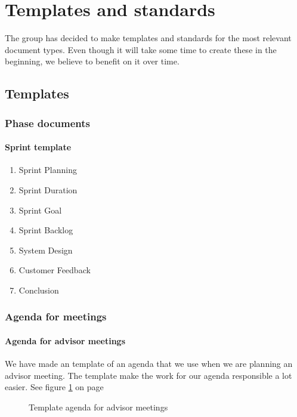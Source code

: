 \section{Templates and standards}
The group has decided to make templates and standards for the most relevant document types. Even though it will take some time to create these in the beginning, we believe to benefit on it over time.

\subsection{Templates}

\subsubsection{Phase documents}

\paragraph{Sprint template}\hfill
\begin{enumerate}
\item{}Sprint Planning
\item{}Sprint Duration
\item{}Sprint Goal
\item{}Sprint Backlog
\item{}System Design
\item{}Customer Feedback
\item{}Conclusion
\end{enumerate}

\subsubsection{Agenda for meetings}

\paragraph{Agenda for advisor meetings}\hfill
\newline
We have made an template of an agenda that we use when we are planning an advisor meeting. The template make the work for our agenda responsible a lot easier.
See figure \ref{fig:agendaadvisor1} on page \pageref{fig:agendaadvisor}
\begin{figure}[hbt]
\begin{center}
\caption{Template agenda for advisor meetings}\label{fig:agendaadvisor1}
\end{center}
\end{figure}
\begin{figure}[hbt]
\begin{center}
\end{center}
\end{figure}

